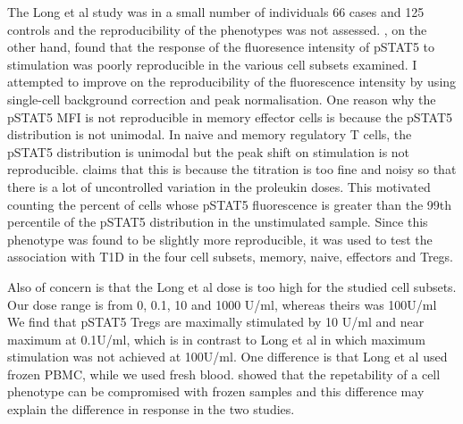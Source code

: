 The Long et al study was in a small number of individuals 66 cases and 125 controls and the reproducibility of the phenotypes was not assessed.
, on the other hand, found that the response of the fluoresence intensity of pSTAT5 to stimulation was poorly reproducible in the various cell subsets
examined.  I attempted to improve on the reproducibility of the fluorescence intensity by using single-cell background correction and peak normalisation.
One reason why the pSTAT5 MFI is not reproducible in memory effector cells is because the pSTAT5 distribution is not unimodal.
In naive and memory regulatory T cells, the pSTAT5 distribution is unimodal but the peak shift on stimulation is not reproducible.
 claims that this is because the titration is too fine and noisy so that there is a lot of uncontrolled variation in the proleukin doses.
This motivated counting the percent of cells whose pSTAT5 fluorescence is greater than the 99th percentile of the pSTAT5 distribution in the unstimulated sample.
Since this phenotype was found to be slightly more reproducible, it was used to test the association with T1D in the four cell subsets, memory, naive, effectors and Tregs.




Also of concern is that the Long et al dose is too high for the studied cell subsets.
Our dose range is from 0, 0.1, 10 and 1000 U/ml, whereas theirs was 100U/ml 
We find that pSTAT5 Tregs are maximally stimulated by 10 U/ml and near maximum at 0.1U/ml,
which is in contrast to Long et al in which maximum stimulation was not achieved at 100U/ml.
One difference is that Long et al used frozen \gls{PBMC}, while we used fresh blood.
\cite{Dendrou:2009dv} showed that the repetability of a cell phenotype can be compromised with frozen samples
and this difference may explain the difference in response in the two studies.










